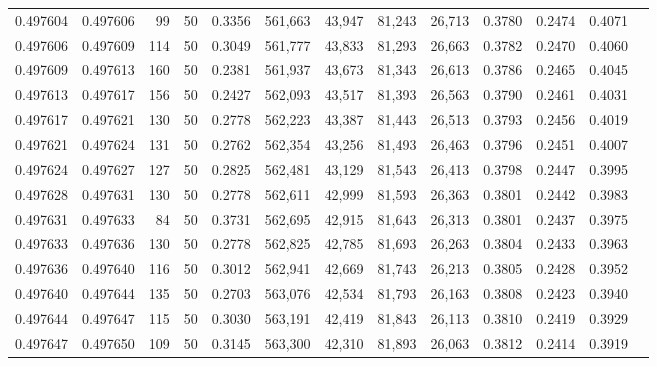\begin{tabular}{rrrrrrrrrrrrr}
0.497604 & 0.497606 &    99 &  50 &                                     0.3356 & 561,663 &  43,947 &  81,243 &  26,713 & 0.3780 & 0.2474 & 0.4071 \\
0.497606 & 0.497609 &   114 &  50 &                                     0.3049 & 561,777 &  43,833 &  81,293 &  26,663 & 0.3782 & 0.2470 & 0.4060 \\
0.497609 & 0.497613 &   160 &  50 &                                     0.2381 & 561,937 &  43,673 &  81,343 &  26,613 & 0.3786 & 0.2465 & 0.4045 \\
0.497613 & 0.497617 &   156 &  50 &                                     0.2427 & 562,093 &  43,517 &  81,393 &  26,563 & 0.3790 & 0.2461 & 0.4031 \\
0.497617 & 0.497621 &   130 &  50 &                                     0.2778 & 562,223 &  43,387 &  81,443 &  26,513 & 0.3793 & 0.2456 & 0.4019 \\
0.497621 & 0.497624 &   131 &  50 &                                     0.2762 & 562,354 &  43,256 &  81,493 &  26,463 & 0.3796 & 0.2451 & 0.4007 \\
0.497624 & 0.497627 &   127 &  50 &                                     0.2825 & 562,481 &  43,129 &  81,543 &  26,413 & 0.3798 & 0.2447 & 0.3995 \\
0.497628 & 0.497631 &   130 &  50 &                                     0.2778 & 562,611 &  42,999 &  81,593 &  26,363 & 0.3801 & 0.2442 & 0.3983 \\
0.497631 & 0.497633 &    84 &  50 &                                     0.3731 & 562,695 &  42,915 &  81,643 &  26,313 & 0.3801 & 0.2437 & 0.3975 \\
0.497633 & 0.497636 &   130 &  50 &                                     0.2778 & 562,825 &  42,785 &  81,693 &  26,263 & 0.3804 & 0.2433 & 0.3963 \\
0.497636 & 0.497640 &   116 &  50 &                                     0.3012 & 562,941 &  42,669 &  81,743 &  26,213 & 0.3805 & 0.2428 & 0.3952 \\
0.497640 & 0.497644 &   135 &  50 &                                     0.2703 & 563,076 &  42,534 &  81,793 &  26,163 & 0.3808 & 0.2423 & 0.3940 \\
0.497644 & 0.497647 &   115 &  50 &                                     0.3030 & 563,191 &  42,419 &  81,843 &  26,113 & 0.3810 & 0.2419 & 0.3929 \\
0.497647 & 0.497650 &   109 &  50 &                                     0.3145 & 563,300 &  42,310 &  81,893 &  26,063 & 0.3812 & 0.2414 & 0.3919 \\

\end{tabular}
